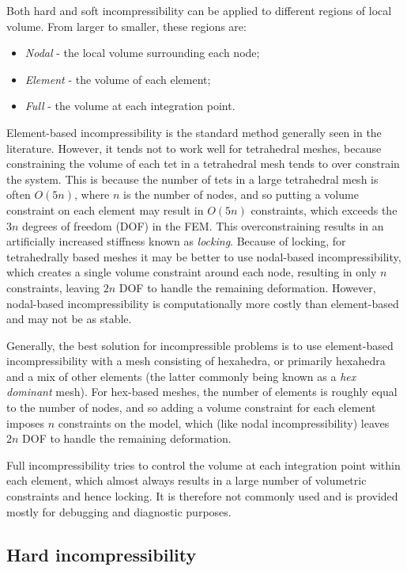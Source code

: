 Both hard and soft incompressibility can be applied to different
regions of local volume. From larger to smaller, these regions are:

\begin{itemize}
\item {\it Nodal} - the local volume surrounding each node;
\item {\it Element} - the volume of each element;
\item {\it Full} - the volume at each integration point.
\end{itemize}

Element-based incompressibility is the standard method generally seen
in the literature. However, it tends not to work well for
tetrahedral meshes, because constraining the volume of each tet in a
tetrahedral mesh tends to over constrain the system. This is because
the number of tets in a large tetrahedral mesh is often $O(5 n)$,
where $n$ is the number of nodes, and so putting a volume constraint
on each element may result in $O(5 n)$ constraints, which exceeds the
$3 n$ degrees of freedom (DOF) in the FEM. This overconstraining results in an
artificially increased stiffness known as \emph{locking}. Because of
locking, for tetrahedrally based meshes it may be better to use
nodal-based incompressibility, which creates a single volume constraint
around each node, resulting in only $n$ constraints, leaving $2 n$ DOF
to handle the remaining deformation.  However, nodal-based
incompressibility is computationally more costly than element-based
and may not be as stable.

Generally, the best solution for incompressible problems is to use
element-based incompressibility with a mesh consisting of hexahedra,
or primarily hexahedra and a mix of other elements (the latter
commonly being known as a \emph{hex dominant} mesh). For hex-based
meshes, the number of elements is roughly equal to the number of
nodes, and so adding a volume constraint for each element imposes $n$
constraints on the model, which (like nodal incompressibility)
leaves $2 n$ DOF to handle the remaining deformation.

Full incompressibility tries to control the volume at each
integration point within each element, which almost always results in
a large number of volumetric constraints and hence locking. It is
therefore not commonly used and is provided mostly for debugging and
diagnostic purposes.

\subsection{Hard incompressibility}
\label{HardIncomp:sec}


